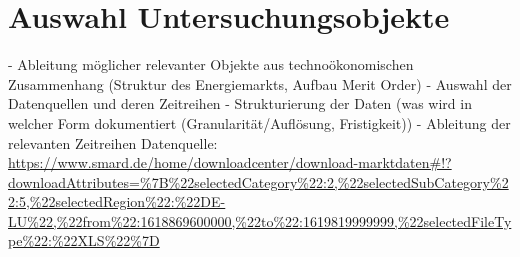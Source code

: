 \section{Auswahl Untersuchungsobjekte}
-	Ableitung möglicher relevanter Objekte aus technoökonomischen Zusammenhang (Struktur des Energiemarkts, Aufbau Merit Order)
-	Auswahl der Datenquellen und deren Zeitreihen
-	Strukturierung der Daten (was wird in welcher Form dokumentiert (Granularität/Auflösung, Fristigkeit))
-	Ableitung der relevanten Zeitreihen
Datenquelle: \url{https://www.smard.de/home/downloadcenter/download-marktdaten#!?downloadAttributes=%7B%22selectedCategory%22:2,%22selectedSubCategory%22:5,%22selectedRegion%22:%22DE-LU%22,%22from%22:1618869600000,%22to%22:1619819999999,%22selectedFileType%22:%22XLS%22%7D}

